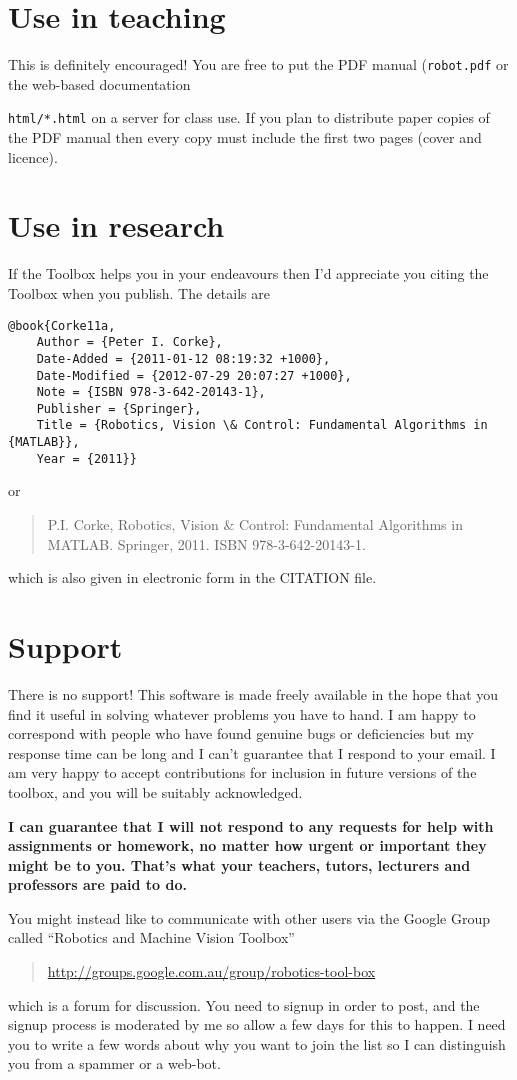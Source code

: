 \documentclass[a4paper]{report}
\begin{document}
\section{Use in teaching}
This is definitely encouraged!
You are free to put the PDF manual (\texttt{robot.pdf} or the web-based documentation {\texttt{html/*.html} on a server for class
use.
If you plan to distribute paper copies of the PDF manual then every copy must include the first two pages (cover and licence).

\section{Use in research}
If the Toolbox helps you in your endeavours then I'd appreciate you citing the Toolbox when you publish.
The details are
\begin{verbatim}
@book{Corke11a,
    Author = {Peter I. Corke},
    Date-Added = {2011-01-12 08:19:32 +1000},
    Date-Modified = {2012-07-29 20:07:27 +1000},
    Note = {ISBN 978-3-642-20143-1},
    Publisher = {Springer},
    Title = {Robotics, Vision \& Control: Fundamental Algorithms in {MATLAB}},
    Year = {2011}}
\end{verbatim}
or
\begin{quote}
P.I. Corke, Robotics, Vision \& Control: Fundamental Algorithms in MATLAB. Springer, 2011. ISBN 978-3-642-20143-1.
\end{quote}
which is also given in electronic form in the CITATION file.

\section{Support}
There is no support!  This software is made freely available in the hope that you find it useful in solving whatever problems
you have to hand.
I am happy to correspond with people who have found genuine
bugs or deficiencies but my response time can be long and I can't guarantee that I respond to your email.
I am very happy to accept contributions for inclusion in future versions of the
toolbox, and you will be suitably acknowledged.

\textbf{I can guarantee that I will not respond to any requests for help with assignments or homework, no matter
how urgent or important they might be to you.  That's what your teachers, tutors, lecturers and professors are paid to do.}

You might instead like to communicate with other users via 
the Google Group called ``Robotics and Machine Vision Toolbox'' 
\begin{quote}
\url{http://groups.google.com.au/group/robotics-tool-box}
\end{quote}
which is a forum for discussion.
You need to signup in order to post, and the signup process is moderated by me so allow a few
days for this to happen.  I need you to write a few words about why you want to join the list
so I can distinguish you from a spammer or a web-bot.

}
\end{document}
